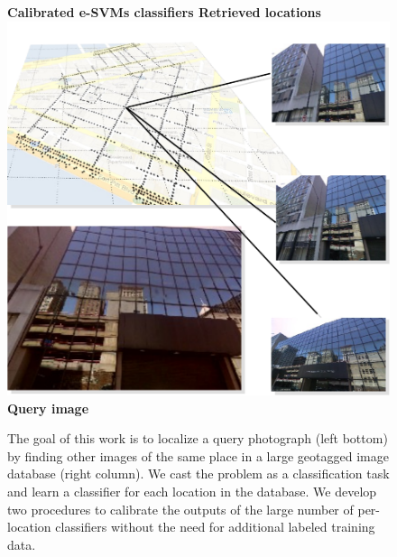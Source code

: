 \maketitle

\begin{figure}[th]
  \textbf{
    \hspace{0.05\linewidth} Calibrated e-SVMs classifiers \hspace{0.15\linewidth} Retrieved locations \hspace{0.05\linewidth}
  }
  \includegraphics[width=1.0\linewidth]{imgs/titleVertical.pdf}
  \textbf{\textcolor{white}{\quad\quad}Query image}
  \caption{
          The goal of this work is to localize a query photograph (left bottom) by finding other images of the same place in a large geotagged image database (right column). We cast the problem as a classification task and learn a classifier for each location in the database. 
          We develop two procedures to calibrate the outputs of the large number of per-location classifiers without the need for additional labeled training data.
        }
\end{figure}

